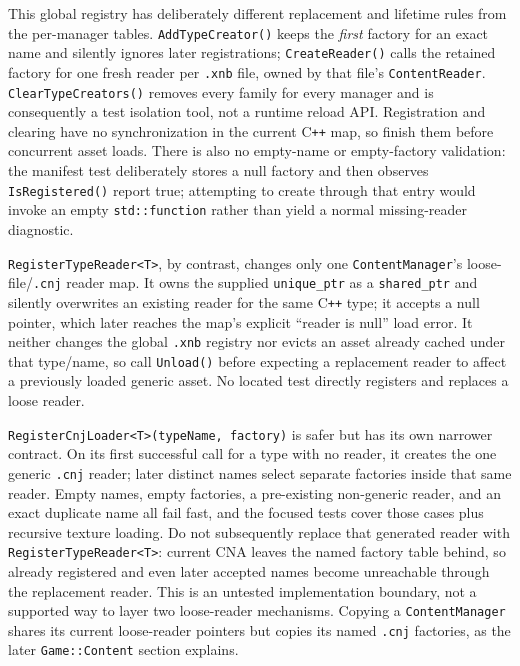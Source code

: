 This global registry has deliberately different replacement and lifetime rules from the
per-manager tables. \texttt{AddTypeCreator()} keeps the \emph{first} factory for an exact name
and silently ignores later registrations; \texttt{CreateReader()} calls the retained factory for
one fresh reader per \texttt{.xnb} file, owned by that file's \texttt{ContentReader}.
\texttt{ClearTypeCreators()} removes every family for every manager and is consequently a test
isolation tool, not a runtime reload API. Registration and clearing have no synchronization in
the current C\texttt{++} map, so finish them before concurrent asset loads. There is also no
empty-name or empty-factory validation: the manifest test deliberately stores a null factory and
then observes \texttt{IsRegistered()} report true; attempting to create through that entry would
invoke an empty \texttt{std::function} rather than yield a normal missing-reader diagnostic.

\texttt{RegisterTypeReader<T>}, by contrast, changes only one \texttt{ContentManager}'s
loose-file/\texttt{.cnj} reader map. It owns the supplied \texttt{unique\_ptr} as a
\texttt{shared\_ptr} and silently overwrites an existing reader for the same C\texttt{++} type;
it accepts a null pointer, which later reaches the map's explicit ``reader is null'' load error.
It neither changes the global \texttt{.xnb} registry nor evicts an asset already cached under
that type/name, so call \texttt{Unload()} before expecting a replacement reader to affect a
previously loaded generic asset. No located test directly registers and replaces a loose reader.

\texttt{RegisterCnjLoader<T>(typeName, factory)} is safer but has its own narrower contract. On
its first successful call for a type with no reader, it creates the one generic \texttt{.cnj}
reader; later distinct names select separate factories inside that same reader. Empty names,
empty factories, a pre-existing non-generic reader, and an exact duplicate name all fail fast,
and the focused tests cover those cases plus recursive texture loading. Do not subsequently
replace that generated reader with \texttt{RegisterTypeReader<T>}: current CNA leaves the named
factory table behind, so already registered and even later accepted names become unreachable
through the replacement reader. This is an untested implementation boundary, not a supported
way to layer two loose-reader mechanisms. Copying a \texttt{ContentManager} shares its current
loose-reader pointers but copies its named \texttt{.cnj} factories, as the later
\texttt{Game::Content} section explains.

